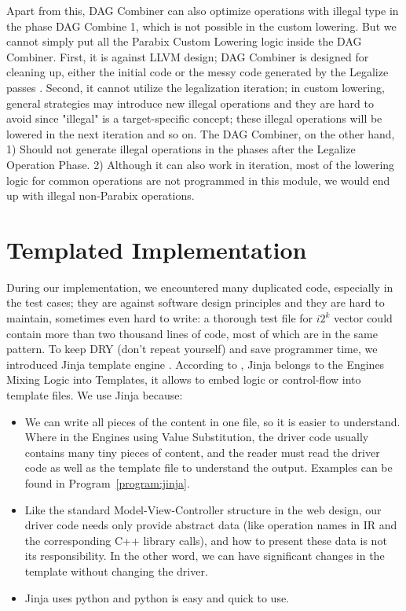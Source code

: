 Apart from this, DAG Combiner can also optimize operations with illegal type in the phase DAG Combine 1, which is not possible in the custom lowering. But we cannot simply put all the Parabix Custom Lowering logic inside the DAG Combiner. First, it is against LLVM design; DAG Combiner is designed for cleaning up, either the initial code or the messy code generated by the Legalize passes \cite{llvm_code_gen}. Second, it cannot utilize the legalization iteration; in custom lowering, general strategies may introduce new illegal operations and they are hard to avoid since "illegal" is a target-specific concept; these illegal operations will be lowered in the next iteration and so on. The DAG Combiner, on the other hand, 1) Should not generate illegal operations in the phases after the Legalize Operation Phase. 2) Although it can also work in iteration, most of the lowering logic for common operations are not programmed in this module, we would end up with illegal non-Parabix operations.

\section{Templated Implementation}
During our implementation, we encountered many duplicated code, especially in the test cases; they are against software design principles and they are hard to maintain, sometimes even hard to write: a thorough test file for $i2^k$ vector could contain more than two thousand lines of code, most of which are in the same pattern. To keep DRY (don't repeat yourself) and save programmer time, we introduced Jinja template engine \cite{jinja_engine}. According to \cite{python_templating}, Jinja belongs to the Engines Mixing Logic into Templates, it allows to embed logic or control-flow into template files. We use Jinja because:

\begin{itemize}
    \item We can write all pieces of the content in one file, so it is easier to understand. Where in the Engines using Value Substitution, the driver code usually contains many tiny pieces of content, and the reader must read the driver code as well as the template file to understand the output. Examples can be found in Program~\ref{program:jinja}.
    \item Like the standard Model-View-Controller structure in the web design, our driver code needs only provide abstract data (like operation names in IR and the corresponding C++ library calls), and how to present these data is not its responsibility. In the other word, we can have significant changes in the template without changing the driver.
    \item Jinja uses python and python is easy and quick to use.
\end{itemize}

